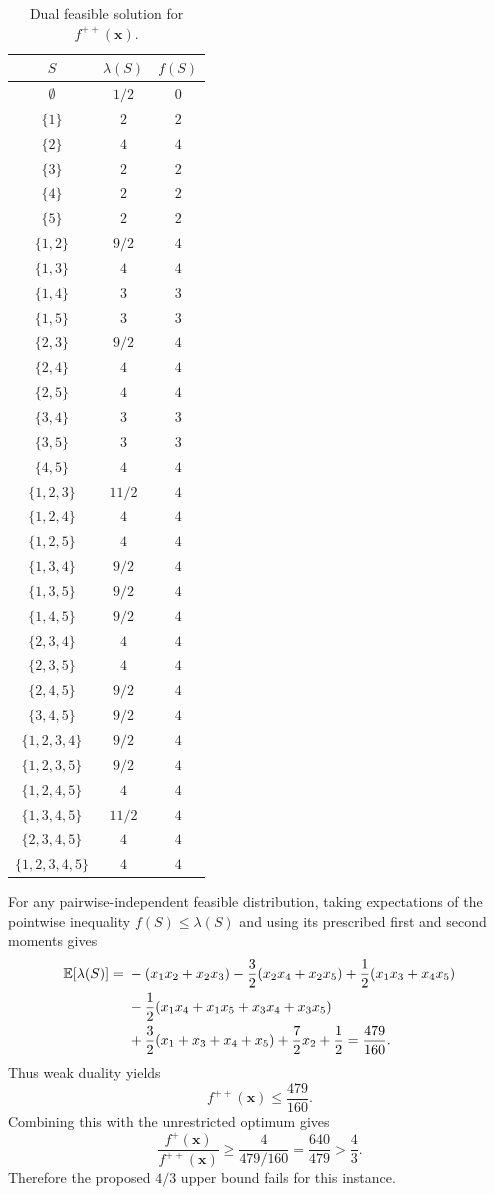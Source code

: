 \begin{longtable}{ccc}
\caption{Dual feasible solution for $f^{++}(\boldsymbol{x})$.}
\label{tab:dual}
\\
$S$ & $\lambda(S)$ & $f(S)$\\ \hline
$\emptyset$ & $1/2$ & $0$\\
$\{1\}$ & $2$ & $2$\\
$\{2\}$ & $4$ & $4$\\
$\{3\}$ & $2$ & $2$\\
$\{4\}$ & $2$ & $2$\\
$\{5\}$ & $2$ & $2$\\
$\{1,2\}$ & $9/2$ & $4$\\
$\{1,3\}$ & $4$ & $4$\\
$\{1,4\}$ & $3$ & $3$\\
$\{1,5\}$ & $3$ & $3$\\
$\{2,3\}$ & $9/2$ & $4$\\
$\{2,4\}$ & $4$ & $4$\\
$\{2,5\}$ & $4$ & $4$\\
$\{3,4\}$ & $3$ & $3$\\
$\{3,5\}$ & $3$ & $3$\\
$\{4,5\}$ & $4$ & $4$\\
$\{1,2,3\}$ & $11/2$ & $4$\\
$\{1,2,4\}$ & $4$ & $4$\\
$\{1,2,5\}$ & $4$ & $4$\\
$\{1,3,4\}$ & $9/2$ & $4$\\
$\{1,3,5\}$ & $9/2$ & $4$\\
$\{1,4,5\}$ & $9/2$ & $4$\\
$\{2,3,4\}$ & $4$ & $4$\\
$\{2,3,5\}$ & $4$ & $4$\\
$\{2,4,5\}$ & $9/2$ & $4$\\
$\{3,4,5\}$ & $9/2$ & $4$\\
$\{1,2,3,4\}$ & $9/2$ & $4$\\
$\{1,2,3,5\}$ & $9/2$ & $4$\\
$\{1,2,4,5\}$ & $4$ & $4$\\
$\{1,3,4,5\}$ & $11/2$ & $4$\\
$\{2,3,4,5\}$ & $4$ & $4$\\
$\{1,2,3,4,5\}$ & $4$ & $4$\\
\end{longtable}

For any pairwise-independent feasible distribution, taking expectations of
the pointwise inequality $f(S)\leq\lambda(S)$ and using its prescribed first
and second moments gives
\[
\begin{aligned}
\mathbb{E}[\lambda(S)]={}&-(x_1x_2+x_2x_3)
-\frac32(x_2x_4+x_2x_5)+\frac12(x_1x_3+x_4x_5)\\
&-\frac12(x_1x_4+x_1x_5+x_3x_4+x_3x_5)\\
&+\frac32(x_1+x_3+x_4+x_5)+\frac72x_2+\frac12
=\frac{479}{160}.
\end{aligned}
\]
Thus weak duality yields
\[
  f^{++}(\boldsymbol{x})\leq\frac{479}{160}.
\]
Combining this with the unrestricted optimum gives
\[
 \frac{f^+(\boldsymbol{x})}{f^{++}(\boldsymbol{x})}
 \geq\frac{4}{479/160}=\frac{640}{479}>\frac43.
\]
Therefore the proposed $4/3$ upper bound fails for this instance.
